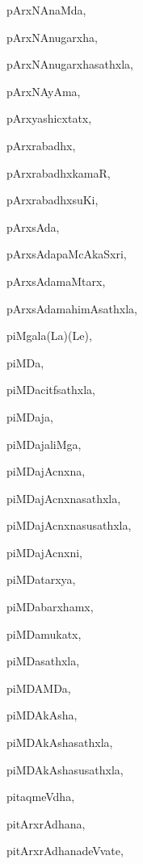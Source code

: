\begin{multicols}{2}
{pArxNAnaMda}, \pageref{pArxNAnaMda}

{pArxNAnugarxha}, \pageref{pArxNAnugarxha}

{pArxNAnugarxhasathxla}, \pageref{pArxNAnugarxhasathxla}

{pArxNAyAma}, \pageref{pArxNAyAma}

{pArxyashicxtatx}, \pageref{pArxyashicxtatx}

{pArxrabadhx}, \pageref{pArxrabadhx}

{pArxrabadhxkamaR}, \pageref{pArxrabadhxkamaR}

{pArxrabadhxsuKi}, \pageref{pArxrabadhxsuKi}

{pArxsAda}, \pageref{pArxsAda}

{pArxsAdapaMcAkaSxri}, \pageref{pArxsAdapaMcAkaSxri}

{pArxsAdamaMtarx}, \pageref{pArxsAdamaMtarx}

{pArxsAdamahimAsathxla}, \pageref{pArxsAdamahimAsathxla}

{piMgala(La)(Le)}, \pageref{piMgalaLaLe}

{piMDa}, \pageref{piMDa}

{piMDacitfsathxla}, \pageref{piMDacitfsathxla}

{piMDaja}, \pageref{piMDaja}

{piMDajaliMga}, \pageref{piMDajaliMga}

{piMDajAcnxna}, \pageref{piMDajAcnxna}

{piMDajAcnxnasathxla}, \pageref{piMDajAcnxnasathxla}

{piMDajAcnxnasusathxla}, \pageref{piMDajAcnxnasusathxla}

{piMDajAcnxni}, \pageref{piMDajAcnxni}

{piMDatarxya}, \pageref{piMDatarxya}

{piMDabarxhamx}, \pageref{piMDabarxhamx}

{piMDamukatx}, \pageref{piMDamukatx}

{piMDasathxla}, \pageref{piMDasathxla}

{piMDAMDa}, \pageref{piMDAMDa}

{piMDAkAsha}, \pageref{piMDAkAsha}

{piMDAkAshasathxla}, \pageref{piMDAkAshasathxla}

{piMDAkAshasusathxla}, \pageref{piMDAkAshasusathxla}

{pitaqmeVdha}, \pageref{pitaqmeVdha}

{pitArxrAdhana}, \pageref{pitArxrAdhana}

{pitArxrAdhanadeVvate}, \pageref{pitArxrAdhanadeVvate}


\end{multicols}
